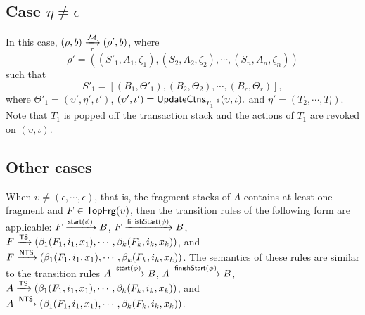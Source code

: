 \subsection*{Case $\eta\neq\epsilon$}
In this case, 
$(\rho,b) \xrightarrow[\tau]{{\mathcal{M} }} (\rho',b)$, where %
$$\rho' = ((S'_1, A_1,\zeta_1), (S_2, A_2,\zeta_2), \cdots, (S_n, A_n,\zeta_n))$$
such that 
$$S'_1 =[(B_1, \Theta'_1), (B_2, \Theta_2), \cdots, (B_r, \Theta_r)],$$ 
where 
$\Theta'_1 = (\upsilon', \eta', \iota')$, $(\upsilon', \iota') = \mathsf{UpdateCtns}_{T_1^{-1}}(\upsilon, \iota),$ and $\eta' = (T_2, \cdots, T_l)$.
Note that $T_1$ is popped off the transaction stack and the actions of $T_1$ are revoked on $(\upsilon, \iota)$.
 

\subsection{Other cases}

When $\upsilon \neq (\epsilon, \cdots, \epsilon)$, that is, the fragment stacks of $A$ contains at least one fragment and $F \in {\sf TopFrg}(\upsilon)$, then the transition rules of the following form are applicable:  $F \xrightarrow{{\mathsf{start} }(\phi)} B$, $ F \xrightarrow{{\mathsf{finishStart} }(\phi)} B$,  $F \xrightarrow{{\sf TS}} (\beta_1(F_1, i_1, x_1), \cdots, \beta_k(F_k, i_k, x_k))$, and $F \xrightarrow{{\sf NTS}} (\beta_1(F_1, i_1, x_1), \cdots, \beta_k(F_k, i_k, x_k))$. 
%
The semantics of these rules are similar to the transition rules $A \xrightarrow{{\mathsf{start} }(\phi)} B$, $A \xrightarrow{{\mathsf{finishStart} }(\phi)} B$,  $A \xrightarrow{{\sf TS}} (\beta_1(F_1, i_1, x_1), \cdots, \beta_k(F_k, i_k, x_k))$, and $A \xrightarrow{{\sf NTS}} (\beta_1(F_1, i_1, x_1), \cdots, \beta_k(F_k, i_k, x_k))$.



